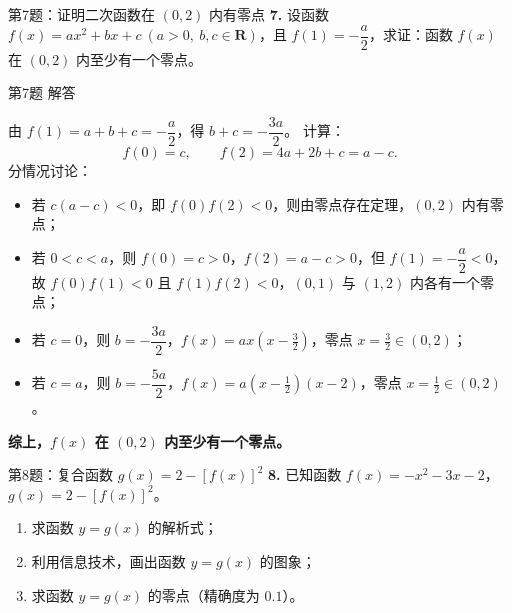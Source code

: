 \documentclass[10pt,aspectratio=169,serif]{beamer}
\begin{document}
\begin{frame}[t]{第7题：证明二次函数在 $(0,2)$ 内有零点}
\textbf{7.} 设函数 $f(x)=ax^{2}+bx+c\ (a>0,\ b,c\in\mathbf{R})$，且 $f(1)=-\dfrac{a}{2}$，求证：函数 $f(x)$ 在 $(0,2)$ 内至少有一个零点。
\end{frame}

\begin{frame}[t]{第7题 解答}
\begin{tcolorbox}[colback=orange!10,colframe=orange,title=\textbf{证明}]
由 $f(1)=a+b+c=-\dfrac{a}{2}$，得 $b+c=-\dfrac{3a}{2}$。
\smallskip
计算：
\[
f(0)=c,\qquad f(2)=4a+2b+c=a-c.
\]
分情况讨论：
\begin{itemize}
  \item 若 $c(a-c)<0$，即 $f(0)f(2)<0$，则由零点存在定理，$(0,2)$ 内有零点；
  \item 若 $0<c<a$，则 $f(0)=c>0$，$f(2)=a-c>0$，但 $f(1)=-\dfrac{a}{2}<0$，故 $f(0)f(1)<0$ 且 $f(1)f(2)<0$，$(0,1)$ 与 $(1,2)$ 内各有一个零点；
  \item 若 $c=0$，则 $b=-\dfrac{3a}{2}$，$f(x)=ax(x-\tfrac32)$，零点 $x=\tfrac32\in(0,2)$；
  \item 若 $c=a$，则 $b=-\dfrac{5a}{2}$，$f(x)=a(x-\tfrac12)(x-2)$，零点 $x=\tfrac12\in(0,2)$。
\end{itemize}
\textbf{综上，$f(x)$ 在 $(0,2)$ 内至少有一个零点。}
\end{tcolorbox}
\end{frame}

\begin{frame}[t]{第8题：复合函数 $g(x)=2-[f(x)]^{2}$}
\textbf{8.} 已知函数 $f(x)=-x^{2}-3x-2$，$g(x)=2-[f(x)]^{2}$。
\begin{enumerate}
  \item 求函数 $y=g(x)$ 的解析式；
  \item 利用信息技术，画出函数 $y=g(x)$ 的图象；
  \item 求函数 $y=g(x)$ 的零点（精确度为 $0.1$）。
\end{enumerate}
\end{frame}
\end{document}
